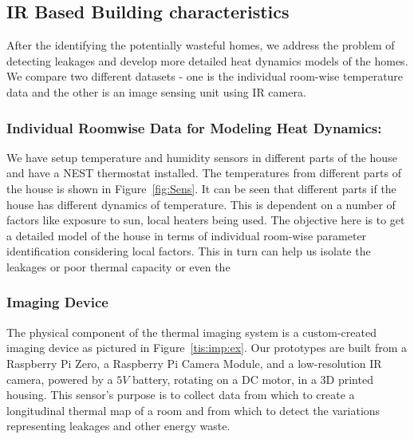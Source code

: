 

\subsection{IR Based Building characteristics}
\label{sec:IRLeak}

\indent After the identifying the potentially wasteful homes, we address the problem of detecting leakages and develop more detailed heat dynamics models of the homes. We compare two different datasets - one is the individual room-wise temperature data and the other is an image sensing unit using IR camera. 

\subsubsection{\textbf{Individual Roomwise Data for Modeling Heat Dynamics:}}

\indent We have setup temperature and humidity sensors in different parts of the house and have a NEST thermostat installed. The temperatures from different parts of the house is shown in Figure~\ref{fig:Sens}. It can be seen that different parts if the house has different dynamics of temperature. This is dependent on a number of factors like exposure to sun, local heaters being used. The objective here is to get a detailed model of the house in terms of individual room-wise parameter identification considering local factors. This in turn can help us isolate the leakages or poor thermal capacity or even the  

 
 
\subsubsection{\textbf{Imaging Device}}
 

The physical component of the thermal imaging system is a custom-created imaging device as pictured in Figure~\ref{tis:imp:ex}. Our prototypes are built from a Raspberry Pi Zero, a Raspberry Pi Camera Module, and a low-resolution IR camera, powered by a $5V$ battery, rotating on a DC motor, in a 3D printed housing. This sensor's purpose is to collect data from which to create a longitudinal thermal
map of a room and from which to detect the variations representing leakages and other energy waste.


